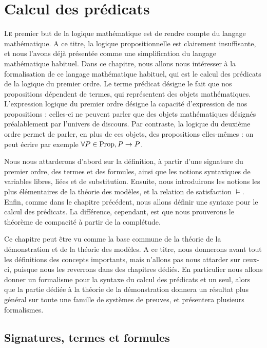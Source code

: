 \chapter{Calcul des prédicats}
\label{chp.logpred}

\minitoc

\lettrine{L}{e} premier but de la logique mathématique est de rendre compte du
langage mathématique. A ce titre, la logique propositionnelle est clairement
insuffisante, et nous l'avons déjà présentée comme une simplification du langage
mathématique habituel. Dans ce chapitre, nous allons nous intéresser à la
formalisation de ce langage mathématique habituel, qui est le calcul des
prédicats de la logique du premier ordre. Le terme prédicat désigne le fait que
nos propositions dépendent de termes, qui représentent des objets mathématiques.
L'expression \og logique du premier ordre\fg{} désigne la capacité d'expression
de nos propositions : celles-ci ne peuvent parler que des objets mathématiques
désignés préalablement par l'univers de discours. Par contraste, la logique du
deuxième ordre permet de parler, en plus de ces objets, des propositions
elles-mêmes : on peut écrire par exemple $\forall P\in\operatorname{Prop}, P\to P$.

Nous nous attarderons d'abord sur la définition, à partir d'une signature du
premier ordre, des termes et des formules, ainsi que les notions syntaxiques de
variables libres, liées et de substitution. Ensuite, nous introduirons les
notions les plus élémentaires de la théorie des modèles, et la relation de
satisfaction $\models$. Enfin, comme dans le chapitre précédent, nous allons
définir une syntaxe pour le calcul des prédicats. La différence, cependant,
est que nous prouverons le théorème de compacité à partir de la complétude.

Ce chapitre peut être vu comme la base commune de la théorie de la démonstration
et de la théorie des modèles. A ce titre, nous donnerons avant tout les
définitions des concepts importants, mais n'allons pas nous attarder sur ceux-ci,
puisque nous les reverrons dans des chapitres dédiés. En particulier nous allons
donner un formalisme pour la syntaxe du calcul des prédicats et un seul, alors
que la partie dédiée à la théorie de la démonstration donnera un résultat plus
général sur toute une famille de systèmes de preuves, et présentera plusieurs
formalismes.

\section{Signatures, termes et formules}

